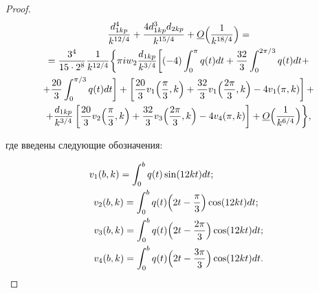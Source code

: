 \begin{proof}
\begin{multline}
\label{mitr:eq50}

\frac{d^4_{1kp}}{k^{12/4}} +

\frac{4d^3_{1kp}d_{2kp}}{k^{15/4}}+

\underline O\Bigl(\frac1{k^{18/4}}\Bigr)=\\=

\frac{3^4}{15\cdot 2^8}\frac1{k^{12/4}}

\biggl\{

\pi i w_2\frac{d_{1kp}}{k^{3/4}}\biggl[

(-4)\int ^\pi_0 q(t)dt+

\frac{32}3\int ^{2\pi/3}_0q(t)dt + \\+

\frac{20}3\int ^{\pi/3}_0 q(t)dt\biggr]+ 

\left[\frac{20}3v_1\Bigl(\frac\pi3,k\Bigr)+  \frac{32}3v_1\Bigl(\frac{2\pi}3,k\Bigr)-

4v_1(\pi,k)\right]+\\+

\frac{d_{1kp}}{k^{3/4}}

\left[\frac{20}3v_2\Bigl(\frac\pi3,k\Bigr)+

\frac{32}3v_3\Bigl(\frac{2\pi}3,k\Bigr)-

4v_4(\pi,k)\right]

+\underline O\Bigl(\frac1{k^{6/4}}\Bigr)\biggr\},

\end{multline}

где введены следующие обозначения:

\begin{equation}

\label{mitr:eq51}

\begin{gathered}

v_1(b,k)=\int^b_0 q(t) \sin(12kt)dt; \hspace{2cm} \\

v_2(b,k)=\int^b_0 q(t)\Bigl(2t-\frac\pi3\Bigr) \cos(12kt)dt; \; \; \\

v_3(b,k)=\int^b_0 q(t)\Bigl(2t-\frac{2\pi}3\Bigr) \cos(12kt)dt;  \\

v_4(b,k)=\int^b_0 q(t)\Bigl(2t-\frac{3\pi}3\Bigr) \cos(12kt)dt.


\end{gathered}

\end{equation}




\end{proof}
